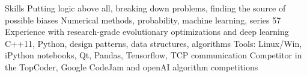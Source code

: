 \begin{rubric}{Skills}
\entry*[]%
Putting logic above all, breaking down problems, finding the source of possible biases 
\entry*[]%
Numerical methods, probability, machine learning, series 57%
\entry*[]%
Experience with research-grade evolutionary optimizations and deep learning%
%
%
\entry*[]%
C++11, Python, design patterns, data structures, algorithms
\entry*[]%
Tools: Linux/Win, iPython notebooks, Qt, Pandas, Tensorflow, TCP communication 
\entry*[]%
Competitor in the TopCoder, Google CodeJam and openAI algorithm competitions
%
%
%
%
\end{rubric}
